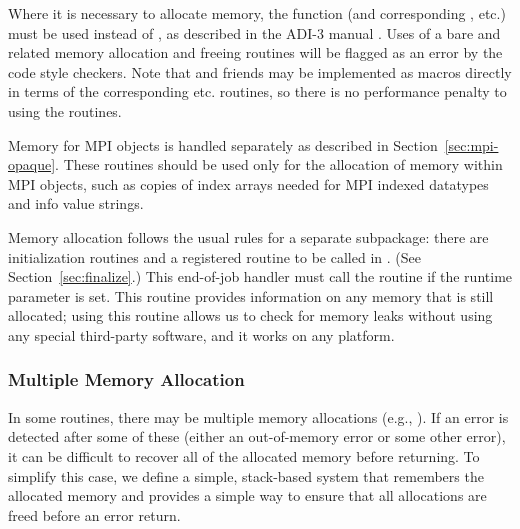 \documentclass{article}
\begin{document}
Where it is necessary to allocate memory, the function 
(and corresponding , etc.) must be used instead of
, as described in the ADI-3 manual \cite{adi3man}.  Uses of a
bare  and related memory allocation and freeing routines will be
flagged as an error by the code style checkers.  Note that 
and friends may be implemented as macros directly in terms of the
corresponding  etc. routines, so there is no performance penalty
to using the  routines.

Memory for MPI objects is handled separately as described in
Section~\ref{sec:mpi-opaque}.  These routines should be used only for
the allocation of memory within MPI objects, such as copies of index
arrays needed for MPI indexed datatypes and info value strings.

Memory allocation follows the usual rules for a separate subpackage: there are
initialization routines and a registered routine to be called in
. (See Section~\ref{sec:finalize}.)  
This end-of-job
handler must call the 
routine  if the runtime parameter
 is set.  This routine
provides information on any memory that is still allocated; using this
routine allows us to check for memory leaks without using any special
third-party software, and it works on any platform.



\subsubsection{Multiple Memory Allocation}
In some routines, there may be multiple memory allocations (e.g.,
).  If an error is 
detected after some of these (either an out-of-memory error or some other
error), it can be difficult to recover all of the allocated memory before
returning.  To simplify this case, we define a simple, stack-based system that
remembers the allocated memory and provides a simple way to ensure that all
allocations are freed before an error return.
\end{document}
